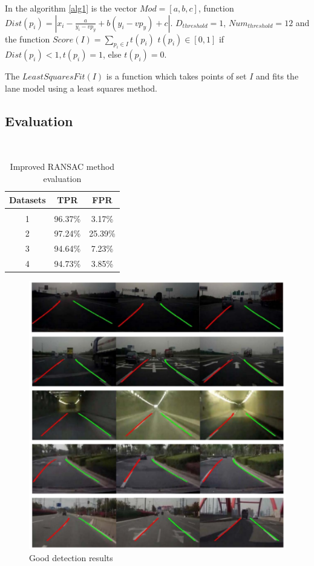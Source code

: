 In the algorithm \ref{alg1} is the vector $Mod = [a,b,c]$, function $Dist(p_i) = |x_i - \frac{a}{y_i - vp_y} + b(y_i - vp_y)+ c|$. $D_{threshold} = 1$, $Num_{threshold} = 12$ and the function $Score(I) = \sum_{p_i \in I}t(p_i)$ 
$t(p_i) \in [0,1]$ if $Dist(p_i) < 1, t(p_i) = 1$, else $t(p_i)=0$.


The $LeastSquaresFit(I)$ is a function which takes points of set $I$ and fits the lane model using a least squares method.

\subsection{Evaluation}

\begin{table}[]
\centering\
\caption{Improved RANSAC method evaluation}
\label{eval1}
\begin{tabular}{c c c}
\hline
Datasets & TPR & FPR \\
\hline 
\\
1 & 96.37\% & 3.17\% \\
2 & 97.24\% & 25.39\% \\
3 & 94.64\% & 7.23\% \\
4 & 94.73\% & 3.85\% \\
\end{tabular}
\end{table}


\begin{figure}[H]
	\centering
   \includegraphics[scale = 0.5]{pictures/good_detections.pdf}
	\caption{Good detection results \cite{ransac}}
	\label{fig5}
\end{figure}


